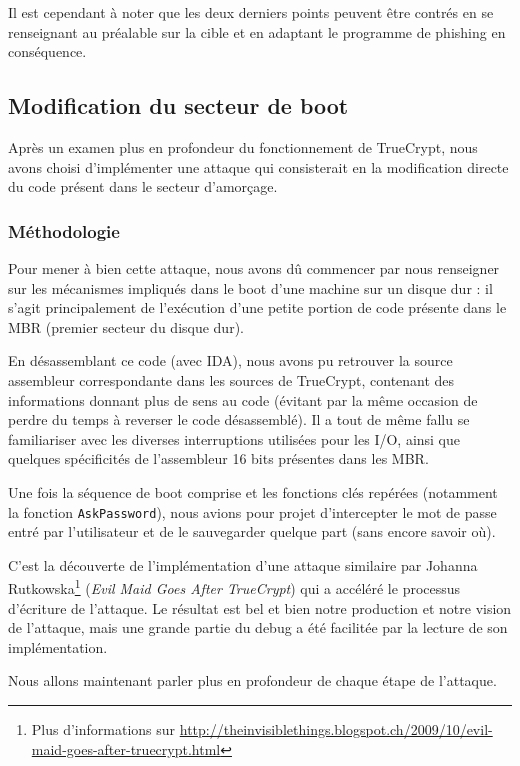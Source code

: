 \documentclass[12pt,a4paper]{article}
\begin{document}
Il est cependant à noter que les deux derniers points peuvent être contrés en
se renseignant au préalable sur la cible et en adaptant le programme de
phishing en conséquence.


\subsection{Modification du secteur de boot}

Après un examen plus en profondeur du fonctionnement de TrueCrypt, nous avons
choisi d'implémenter une attaque qui consisterait en la modification directe du
code présent dans le secteur d'amorçage.

\subsubsection{Méthodologie}

Pour mener à bien cette attaque, nous avons dû commencer par nous renseigner
sur les mécanismes impliqués dans le boot d'une machine sur un disque dur : il
s'agit principalement de l'exécution d'une petite portion de code présente dans le
MBR (premier secteur du disque dur).

En désassemblant ce code (avec IDA), nous avons pu retrouver la source
assembleur correspondante dans les sources de TrueCrypt, contenant des
informations donnant plus de sens au code (évitant par la même occasion de perdre du
temps à reverser le code désassemblé). Il a tout de même fallu se familiariser
avec les diverses interruptions utilisées pour les I/O, ainsi que quelques
spécificités de l'assembleur 16 bits présentes dans les MBR.

Une fois la séquence de boot comprise et les fonctions clés repérées (notamment
la fonction \texttt{AskPassword}), nous avions pour projet d'intercepter le mot de passe
entré par l'utilisateur et de le sauvegarder quelque part (sans encore savoir
où).

C'est la découverte de l'implémentation d'une attaque similaire par Johanna
Rutkowska\footnote{Plus d'informations sur 
\url{http://theinvisiblethings.blogspot.ch/2009/10/evil-maid-goes-after-truecrypt.html}}
(\textit{Evil Maid Goes After TrueCrypt}) qui a accéléré le processus
d'écriture de l'attaque. Le résultat est bel et bien notre production et notre
vision de l'attaque, mais une grande partie du debug a été facilitée par la
lecture de son implémentation.

Nous allons maintenant parler plus en profondeur de chaque étape de l'attaque.
\end{document}
